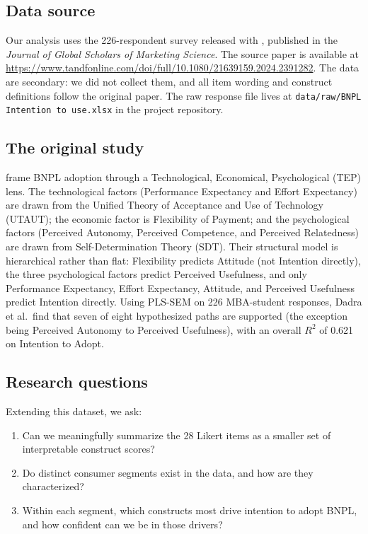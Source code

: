 \documentclass[11pt]{article}
\begin{document}
\subsection{Data source}

Our analysis uses the 226-respondent survey released with
\citet{dadra2024tep}, published in the \emph{Journal of Global
Scholars of Marketing Science}. The source paper is available at
\url{https://www.tandfonline.com/doi/full/10.1080/21639159.2024.2391282}.
The data are secondary: we did not collect them, and all item
wording and construct definitions follow the original paper. The
raw response file lives at
\texttt{data/raw/BNPL Intention to use.xlsx} in the project
repository.

\subsection{The original study}

\citet{dadra2024tep} frame BNPL adoption through a Technological,
Economical, Psychological (TEP) lens. The technological factors
(Performance Expectancy and Effort Expectancy) are drawn from the
Unified Theory of Acceptance and Use of Technology (UTAUT); the
economic factor is Flexibility of Payment; and the psychological
factors (Perceived Autonomy, Perceived Competence, and Perceived
Relatedness) are drawn from Self-Determination Theory (SDT). Their
structural model is hierarchical rather than flat: Flexibility
predicts Attitude (not Intention directly), the three psychological
factors predict Perceived Usefulness, and only Performance
Expectancy, Effort Expectancy, Attitude, and Perceived Usefulness
predict Intention directly. Using PLS-SEM on 226 MBA-student
responses, Dadra et al.\ find that seven of eight hypothesized paths
are supported (the exception being Perceived Autonomy to Perceived
Usefulness), with an overall $R^2$ of 0.621 on Intention to Adopt.

\subsection{Research questions}

Extending this dataset, we ask:
\begin{enumerate}
  \item Can we meaningfully summarize the 28 Likert items as a smaller
        set of interpretable construct scores?
  \item Do distinct consumer segments exist in the data, and how are
        they characterized?
  \item Within each segment, which constructs most drive intention to
        adopt BNPL, and how confident can we be in those drivers?
\end{enumerate}
\end{document}
